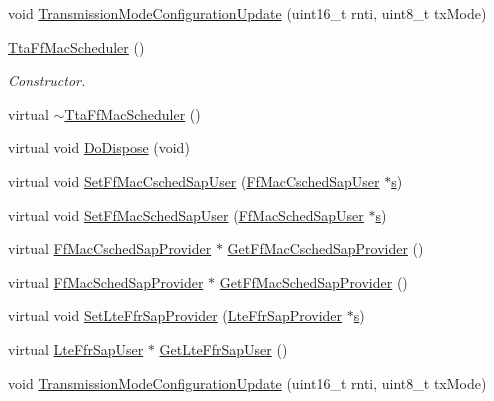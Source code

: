 \begin{DoxyCompactItemize}
\item 
void \hyperlink{classns3_1_1TtaFfMacScheduler_ab2e643d668582cd5254f283eda5281cc}{Transmission\+Mode\+Configuration\+Update} (uint16\+\_\+t rnti, uint8\+\_\+t tx\+Mode)
\item 
\hyperlink{classns3_1_1TtaFfMacScheduler_acf57e9c1615d3e312a4fc3a9748f72ed}{Tta\+Ff\+Mac\+Scheduler} ()
\begin{DoxyCompactList}\small\item\em Constructor. \end{DoxyCompactList}\item 
virtual \hyperlink{classns3_1_1TtaFfMacScheduler_a1eaf2271d4c836c32cc281bb0aa1ed9d}{$\sim$\+Tta\+Ff\+Mac\+Scheduler} ()
\item 
virtual void \hyperlink{classns3_1_1TtaFfMacScheduler_a32b42f1a70faf30540f3694872092f8d}{Do\+Dispose} (void)
\item 
virtual void \hyperlink{classns3_1_1TtaFfMacScheduler_aad31eeab4a6d5b9dc11fddcf92c54b91}{Set\+Ff\+Mac\+Csched\+Sap\+User} (\hyperlink{classns3_1_1FfMacCschedSapUser}{Ff\+Mac\+Csched\+Sap\+User} $\ast$\hyperlink{generate__test__data__lte__sinr_8m_ad83eeb3a142285d1243a08c6b7026df8}{s})
\item 
virtual void \hyperlink{classns3_1_1TtaFfMacScheduler_a83d6bce64a666c9f9c71966210d93c74}{Set\+Ff\+Mac\+Sched\+Sap\+User} (\hyperlink{classns3_1_1FfMacSchedSapUser}{Ff\+Mac\+Sched\+Sap\+User} $\ast$\hyperlink{generate__test__data__lte__sinr_8m_ad83eeb3a142285d1243a08c6b7026df8}{s})
\item 
virtual \hyperlink{classns3_1_1FfMacCschedSapProvider}{Ff\+Mac\+Csched\+Sap\+Provider} $\ast$ \hyperlink{classns3_1_1TtaFfMacScheduler_a7b1bc2e161c963d78fc2e2a22351379d}{Get\+Ff\+Mac\+Csched\+Sap\+Provider} ()
\item 
virtual \hyperlink{classns3_1_1FfMacSchedSapProvider}{Ff\+Mac\+Sched\+Sap\+Provider} $\ast$ \hyperlink{classns3_1_1TtaFfMacScheduler_a9b9bf261eb5176bc7a00d89066a8ccaf}{Get\+Ff\+Mac\+Sched\+Sap\+Provider} ()
\item 
virtual void \hyperlink{classns3_1_1TtaFfMacScheduler_aceb9cdcc8a3ac34414c76a02350faf34}{Set\+Lte\+Ffr\+Sap\+Provider} (\hyperlink{classns3_1_1LteFfrSapProvider}{Lte\+Ffr\+Sap\+Provider} $\ast$\hyperlink{generate__test__data__lte__sinr_8m_ad83eeb3a142285d1243a08c6b7026df8}{s})
\item 
virtual \hyperlink{classns3_1_1LteFfrSapUser}{Lte\+Ffr\+Sap\+User} $\ast$ \hyperlink{classns3_1_1TtaFfMacScheduler_aa396e4418d813cca981b2821adb29414}{Get\+Lte\+Ffr\+Sap\+User} ()
\item 
void \hyperlink{classns3_1_1TtaFfMacScheduler_ab2e643d668582cd5254f283eda5281cc}{Transmission\+Mode\+Configuration\+Update} (uint16\+\_\+t rnti, uint8\+\_\+t tx\+Mode)
\end{DoxyCompactItemize}
